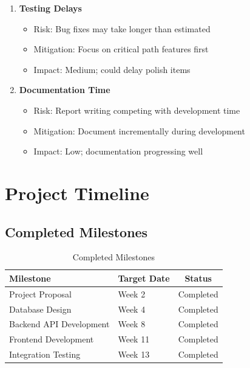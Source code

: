 \begin{enumerate}
    \item \textbf{Testing Delays}
    \begin{itemize}
        \item Risk: Bug fixes may take longer than estimated
        \item Mitigation: Focus on critical path features first
        \item Impact: Medium; could delay polish items
    \end{itemize}
    
    \item \textbf{Documentation Time}
    \begin{itemize}
        \item Risk: Report writing competing with development time
        \item Mitigation: Document incrementally during development
        \item Impact: Low; documentation progressing well
    \end{itemize}
\end{enumerate}

\section{Project Timeline}

\subsection{Completed Milestones}

\begin{table}[htbp]
    \centering
    \caption{Completed Milestones}
    \label{tab:completed-milestones}
    \begin{tabular}{llc}
        \toprule
        \textbf{Milestone} & \textbf{Target Date} & \textbf{Status} \\
        \midrule
        Project Proposal & Week 2 & Completed \\
        Database Design & Week 4 & Completed \\
        Backend API Development & Week 8 & Completed \\
        Frontend Development & Week 11 & Completed \\
        Integration Testing & Week 13 & Completed \\
        \bottomrule
    \end{tabular}
\end{table}

